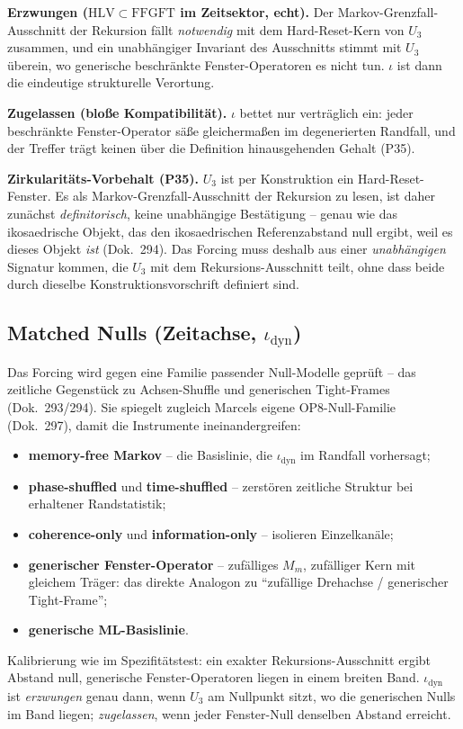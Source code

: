 \textbf{Erzwungen ($\mathrm{HLV}\subset\mathrm{FFGFT}$ im Zeitsektor,
echt).} Der Markov-Grenzfall-Ausschnitt der Rekursion fällt \emph{notwendig}
mit dem Hard-Reset-Kern von $U_3$ zusammen, und ein unabhängiger Invariant
des Ausschnitts stimmt mit $U_3$ überein, wo generische beschränkte
Fenster-Operatoren es nicht tun. $\iota$ ist dann die eindeutige
strukturelle Verortung.

\textbf{Zugelassen (bloße Kompatibilität).} $\iota$ bettet nur
verträglich ein: jeder beschränkte Fenster-Operator säße gleichermaßen im
degenerierten Randfall, und der Treffer trägt keinen über die Definition
hinausgehenden Gehalt (P35).

\textbf{Zirkularitäts-Vorbehalt (P35).} $U_3$ ist per Konstruktion ein
Hard-Reset-Fenster. Es als Markov-Grenzfall-Ausschnitt der Rekursion zu
lesen, ist daher zunächst \emph{definitorisch}, keine unabhängige
Bestätigung -- genau wie das ikosaedrische Objekt, das den ikosaedrischen
Referenzabstand null ergibt, weil es dieses Objekt \emph{ist} (Dok.~294).
Das Forcing muss deshalb aus einer \emph{unabhängigen} Signatur kommen, die
$U_3$ mit dem Rekursions-Ausschnitt teilt, ohne dass beide durch dieselbe
Konstruktionsvorschrift definiert sind.

\subsection*{Matched Nulls (Zeitachse, $\iota_{\text{dyn}}$)}

Das Forcing wird gegen eine Familie passender Null-Modelle geprüft --
das zeitliche Gegenstück zu Achsen-Shuffle und generischen Tight-Frames
(Dok.~293/294). Sie spiegelt zugleich Marcels eigene OP8-Null-Familie
(Dok.~297), damit die Instrumente ineinandergreifen:
\begin{itemize}
  \item \textbf{memory-free Markov} -- die Basislinie, die
    $\iota_{\text{dyn}}$ im Randfall vorhersagt;
  \item \textbf{phase-shuffled} und \textbf{time-shuffled} -- zerstören
    zeitliche Struktur bei erhaltener Randstatistik;
  \item \textbf{coherence-only} und \textbf{information-only} -- isolieren
    Einzelkanäle;
  \item \textbf{generischer Fenster-Operator} -- zufälliges $M_m$,
    zufälliger Kern mit gleichem Träger: das direkte Analogon zu
    \enquote{zufällige Drehachse / generischer Tight-Frame};
  \item \textbf{generische ML-Basislinie}.
\end{itemize}
Kalibrierung wie im Spezifitätstest: ein exakter Rekursions-Ausschnitt
ergibt Abstand null, generische Fenster-Operatoren liegen in einem breiten
Band. $\iota_{\text{dyn}}$ ist \emph{erzwungen} genau dann, wenn $U_3$ am
Nullpunkt sitzt, wo die generischen Nulls im Band liegen; \emph{zugelassen},
wenn jeder Fenster-Null denselben Abstand erreicht.

